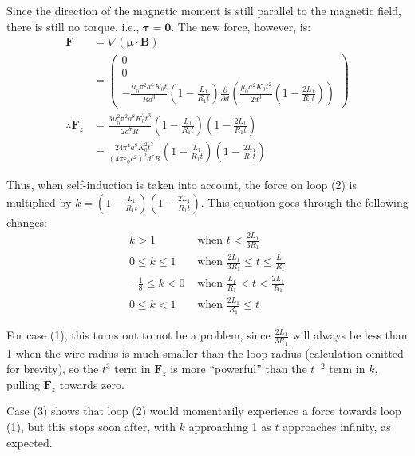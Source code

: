 \documentclass[a4paper]{scrartcl}
\begin{document}
Since the direction of the magnetic moment is still parallel to the magnetic field, there is still no torque. i.e., \(\boldsymbol{\tau} = \mathbf{0}\). The new force, however, is:
\begin{align*}
    \mathbf{F} &= \nabla (\boldsymbol{\mu} \cdot \mathbf{B}) \\
    &= \begin{pmatrix}
        0 \\
        0 \\
        -\frac{\mu_0 \pi^2 a^6 K_0 t}{R d^3} \left( 1 - \frac{L_1}{R_1 t} \right) \frac{\partial}{\partial d} \left( \frac{\mu_0 a^2 K_0 t^2}{2 d^3} \left( 1 - \frac{2 L_1}{R_1 t} \right) \right)
    \end{pmatrix} \\
    \therefore \mathbf{F}_z &= \frac{3 \mu_0^2 \pi^2 a^8 K_0^2 t^3}{2 d^7 R} \left( 1 - \frac{L_1}{R_1 t} \right) \left( 1 - \frac{2 L_1}{R_1 t} \right) \\
    &= \frac{24 \pi^4 a^8 K_0^2 t^3}{(4 \pi \varepsilon_0 c^2)^2 d^7 R} \left( 1 - \frac{L_1}{R_1 t} \right) \left( 1 - \frac{2 L_1}{R_1 t} \right)
\end{align*}

Thus, when self-induction is taken into account, the force on loop (2) is multiplied by \(k = \left( 1 - \frac{L_1}{R_1 t} \right) \left( 1 - \frac{2 L_1}{R_1 t} \right)\). This equation goes through the following changes:
\begin{align}
    k > 1 &\text{ when } t < \frac{2 L_1}{3 R_1} \\
    0 \leq k \leq 1 &\text{ when } \frac{2 L_1}{3 R_1} \leq t \leq \frac{L_1}{R_1} \\
    -\frac{1}{8} \leq k < 0 &\text{ when } \frac{L_1}{R_1} < t < \frac{2 L_1}{R_1} \\
    0 \leq k < 1 &\text{ when } \frac{2 L_1}{R_1} \leq t
\end{align}

For case (1), this turns out to not be a problem, since \(\frac{2 L_1}{3 R_1}\) will always be less than 1 when the wire radius is much smaller than the loop radius (calculation omitted for brevity), so the \(t^3\) term in \(\mathbf{F}_z\) is more ``powerful'' than the \(t^{-2}\) term in \(k\), pulling \(\mathbf{F}_z\) towards zero. 

Case (3) shows that loop (2) would momentarily experience a force towards loop (1), but this stops soon after, with \(k\) approaching 1 as \(t\) approaches infinity, as expected.
\end{document}

